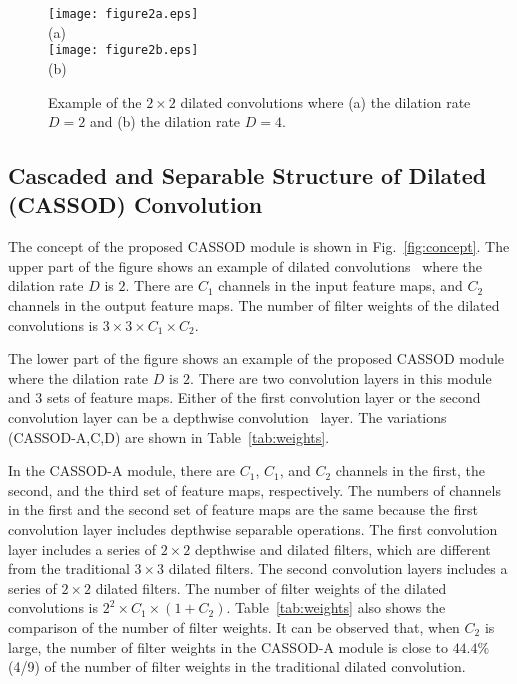 \documentclass[10pt,twocolumn,letterpaper]{article}
\begin{document}
\begin{figure}[h]
\begin{center}
   \texttt{[image: figure2a.eps]}\\
   (a)\\
   \texttt{[image: figure2b.eps]}\\
   (b)\\
\end{center}
   \caption{Example of the $2 \times 2$ dilated convolutions where (a) the dilation rate $D = 2$ and (b) the dilation rate $D = 4$. }
\label{fig:dilated}
\end{figure}

\subsection{Cascaded and Separable Structure of Dilated (CASSOD) Convolution}
\label{subsec:cassod}


The concept of the proposed CASSOD module is shown in Fig.~\ref{fig:concept}. The upper part of the figure shows an example of dilated convolutions~\cite{Wei18} where the dilation rate $D$ is $2$. There are $C_{1}$ channels in the input feature maps, and $C_{2}$ channels in the output feature maps. The number of filter weights of the dilated convolutions is $3 \times 3 \times C_{1} \times C_{2}$. 

The lower part of the figure shows an example of the proposed CASSOD module where the dilation rate $D$ is $2$. There are two convolution layers in this module and 3 sets of feature maps. Either of the first convolution layer or the second convolution layer can be a depthwise convolution~\cite{Howard17} layer. The variations (CASSOD-A,C,D) are shown in Table~\ref{tab:weights}.

In the CASSOD-A module, there are $C_{1}$, $C_{1}$, and $C_{2}$ channels in the first, the second, and the third set of feature maps, respectively. The numbers of channels in the first and the second set of feature maps are the same because the first convolution layer includes depthwise separable operations. The first convolution layer includes a series of $2 \times 2$ depthwise and dilated filters, which are different from the traditional $3 \times 3$ dilated filters. The second convolution layers includes a series of $2 \times 2$ dilated filters. The number of filter weights of the dilated convolutions is $2^{2} \times C_{1}  \times (1 + C_{2})$. Table~\ref{tab:weights} also shows the comparison of the number of filter weights. It can be observed that, when $C_{2}$ is large, the number of filter weights in the CASSOD-A module is close to $44.4\%$ (4/9) of the number of filter weights in the traditional dilated convolution. 
\end{document}
